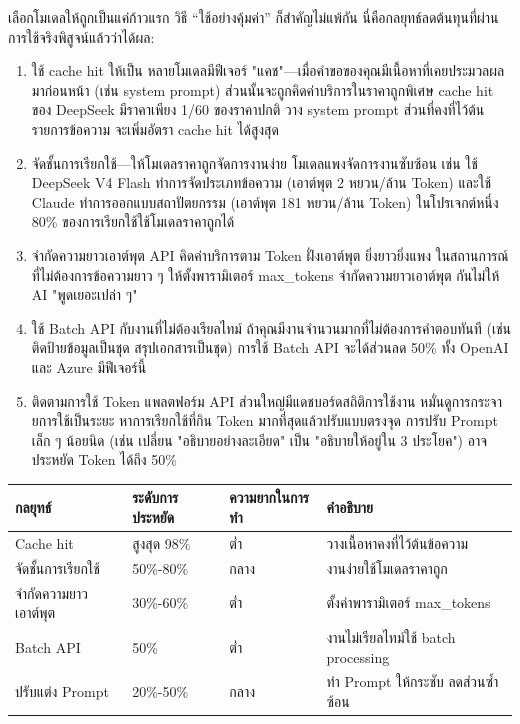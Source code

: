 
เลือกโมเดลให้ถูกเป็นแค่ก้าวแรก วิธี “ใช้อย่างคุ้มค่า” ก็สำคัญไม่แพ้กัน นี่คือกลยุทธ์ลดต้นทุนที่ผ่านการใช้จริงพิสูจน์แล้วว่าได้ผล:

\begin{enumerate}
  \item ใช้ cache hit ให้เป็น หลายโมเดลมีฟีเจอร์ "แคช"—เมื่อคำขอของคุณมีเนื้อหาที่เคยประมวลผลมาก่อนหน้า (เช่น system prompt) ส่วนนั้นจะถูกคิดค่าบริการในราคาถูกพิเศษ cache hit ของ DeepSeek มีราคาเพียง 1/60 ของราคาปกติ วาง system prompt ส่วนที่คงที่ไว้ต้นรายการข้อความ จะเพิ่มอัตรา cache hit ได้สูงสุด
  \item จัดชั้นการเรียกใช้—ให้โมเดลราคาถูกจัดการงานง่าย โมเดลแพงจัดการงานซับซ้อน เช่น ใช้ DeepSeek V4 Flash ทำการจัดประเภทข้อความ (เอาต์พุต 2 หยวน/ล้าน Token) และใช้ Claude ทำการออกแบบสถาปัตยกรรม (เอาต์พุต 181 หยวน/ล้าน Token) ในโปรเจกต์หนึ่ง 80\% ของการเรียกใช้ใช้โมเดลราคาถูกได้
  \item จำกัดความยาวเอาต์พุต API คิดค่าบริการตาม Token ฝั่งเอาต์พุต ยิ่งยาวยิ่งแพง ในสถานการณ์ที่ไม่ต้องการข้อความยาว ๆ ให้ตั้งพารามิเตอร์ max\_tokens จำกัดความยาวเอาต์พุต กันไม่ให้ AI "พูดเยอะเปล่า ๆ"
  \item ใช้ Batch API กับงานที่ไม่ต้องเรียลไทม์ ถ้าคุณมีงานจำนวนมากที่ไม่ต้องการคำตอบทันที (เช่น ติดป้ายข้อมูลเป็นชุด สรุปเอกสารเป็นชุด) การใช้ Batch API จะได้ส่วนลด 50\% ทั้ง OpenAI และ Azure มีฟีเจอร์นี้
  \item ติดตามการใช้ Token แพลตฟอร์ม API ส่วนใหญ่มีแดชบอร์ดสถิติการใช้งาน หมั่นดูการกระจายการใช้เป็นระยะ หาการเรียกใช้ที่กิน Token มากที่สุดแล้วปรับแบบตรงจุด การปรับ Prompt เล็ก ๆ น้อยนิด (เช่น เปลี่ยน "อธิบายอย่างละเอียด" เป็น "อธิบายให้อยู่ใน 3 ประโยค") อาจประหยัด Token ได้ถึง 50\%
\end{enumerate}

\begin{center}
\begin{tabularx}{\linewidth}{|X|X|X|X|}
\hline
\textbf{กลยุทธ์} & \textbf{ระดับการประหยัด} & \textbf{ความยากในการทำ} & \textbf{คำอธิบาย} \tabularnewline
\hline
Cache hit & สูงสุด 98\% & ต่ำ & วางเนื้อหาคงที่ไว้ต้นข้อความ \tabularnewline
จัดชั้นการเรียกใช้ & 50\%-80\% & กลาง & งานง่ายใช้โมเดลราคาถูก \tabularnewline
จำกัดความยาวเอาต์พุต & 30\%-60\% & ต่ำ & ตั้งค่าพารามิเตอร์ max\_tokens \tabularnewline
Batch API & 50\% & ต่ำ & งานไม่เรียลไทม์ใช้ batch processing \tabularnewline
ปรับแต่ง Prompt & 20\%-50\% & กลาง & ทำ Prompt ให้กระชับ ลดส่วนซ้ำซ้อน \tabularnewline
\hline
\end{tabularx}
\end{center}

